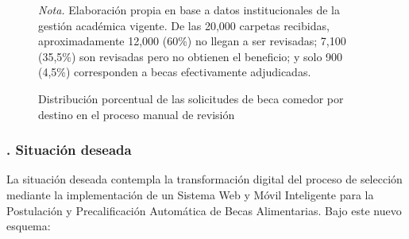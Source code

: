 \begin{figure}[htbp]
\caption{Distribución porcentual de las solicitudes de beca comedor por destino en el proceso manual de revisión}
\label{fig:distribucion_carpetas}

\smallskip
\noindent\raggedright\textit{Nota.} Elaboración propia en base a datos institucionales de la gestión académica vigente. De las 20,000 carpetas recibidas, aproximadamente 12,000 (60\%) no llegan a ser revisadas; 7,100 (35,5\%) son revisadas pero no obtienen el beneficio; y solo 900 (4,5\%) corresponden a becas efectivamente adjudicadas.
\end{figure}



\subsubsection{. Situación deseada}\label{sec:situacion_deseada}

La situación deseada contempla la transformación digital del proceso de selección mediante la implementación de un Sistema Web y Móvil Inteligente para la Postulación y Precalificación Automática de Becas Alimentarias. Bajo este nuevo esquema:

